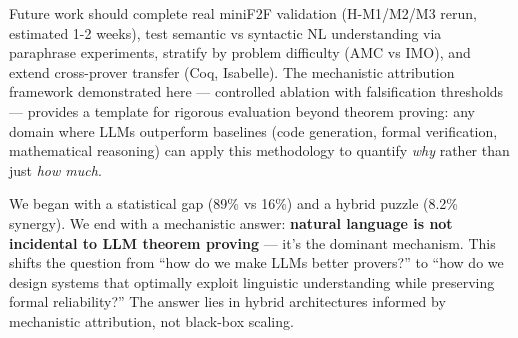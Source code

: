 Future work should complete real miniF2F validation (H-M1/M2/M3 rerun, estimated 1-2 weeks), test semantic vs syntactic NL understanding via paraphrase experiments, stratify by problem difficulty (AMC vs IMO), and extend cross-prover transfer (Coq, Isabelle). The mechanistic attribution framework demonstrated here --- controlled ablation with falsification thresholds --- provides a template for rigorous evaluation beyond theorem proving: any domain where LLMs outperform baselines (code generation, formal verification, mathematical reasoning) can apply this methodology to quantify \emph{why} rather than just \emph{how much}.

We began with a statistical gap (89\% vs 16\%) and a hybrid puzzle (8.2\% synergy). We end with a mechanistic answer: \textbf{natural language is not incidental to LLM theorem proving} --- it's the dominant mechanism. This shifts the question from ``how do we make LLMs better provers?'' to ``how do we design systems that optimally exploit linguistic understanding while preserving formal reliability?'' The answer lies in hybrid architectures informed by mechanistic attribution, not black-box scaling.
